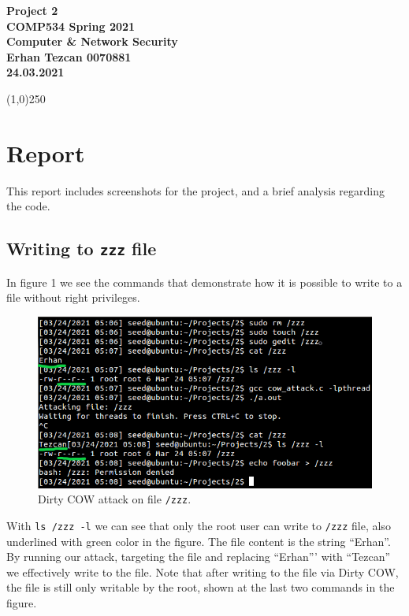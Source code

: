\documentclass[12pt,reqno]{amsart}
\newcommand{\code}[1]{\texttt{#1}}
\begin{document}
\begin{center}
\large\textbf{Project 2 \\ COMP534 Spring 2021\\Computer \& Network Security \\}
\normalsize\textbf{ Erhan Tezcan 0070881 \\ 24.03.2021} \\
\end{center}

\begin{center}
\line(1,0){250}
\end{center}

\section{Report}
This report includes screenshots for the project, and a brief analysis regarding the code.

\subsection{Writing to \code{zzz} file}
In figure 1 we see the commands that demonstrate how it is possible to write to a file without right privileges. 

\begin{figure}[h]
\label{fig:zzz}
\includegraphics[width=\linewidth]{part2.png}
\caption{Dirty COW attack on file \code{/zzz}.}
\end{figure}

With \code{ls /zzz -l} we can see that only the root user can write to \code{/zzz} file, also underlined with green color in the figure. The file content is the string ``Erhan''. By running our attack, targeting the file and replacing ``Erhan''' with ``Tezcan'' we effectively write to the file. Note that after writing to the file via Dirty COW, the file is still only writable by the root, shown at the last two commands in the figure.
\end{document}
